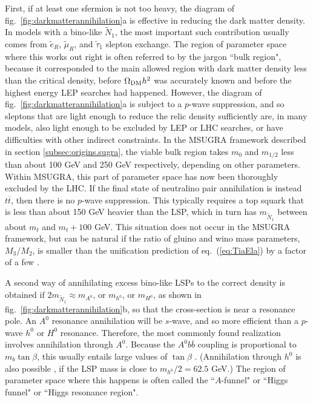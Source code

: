 \documentclass[12pt]{article}
\def\stilde{\widetilde}
\begin{document}
First, if at least one sfermion is not too heavy, the diagram of 
fig.~\ref{fig:darkmatterannihilation}a is effective in reducing the dark 
matter density. In models with a bino-like $\stilde N_1$, the most 
important such contribution usually comes from $\stilde e_R$, $\stilde 
\mu_R$, and $\stilde \tau_1$ slepton exchange. The region of parameter 
space where this works out right is often referred to by the jargon ``bulk 
region", because it corresponded to the main allowed region with dark 
matter density less than the critical density, before $\Omega_{\rm DM} 
h^2$ was accurately known and before the highest energy LEP searches had 
happened. However, the diagram of fig.~\ref{fig:darkmatterannihilation}a 
is subject to a $p$-wave suppression, and so sleptons that are light 
enough to reduce the relic density sufficiently are, in many models, also 
light enough to be excluded by LEP or LHC searches, 
or have difficulties with other indirect constraints. 
In the MSUGRA framework described in 
section \ref{subsec:origins.sugra}, the viable bulk region  
takes $m_0$ and $m_{1/2}$ less than about 100 GeV and 250 GeV 
respectively, depending on other parameters. Within MSUGRA, this part of
parameter space has now been thoroughly excluded by the LHC.
%
If the final state of neutralino pair annihilation 
is instead $t \overline t$, then there is no $p$-wave
suppression. This typically requires a top squark that is less than
about 150 GeV heavier than the LSP, which in turn has $m_{\tilde N_1}$ 
between about
$m_t$ and $m_t + 100$ GeV. This situation
does not occur in the MSUGRA framework,
but can be natural if the ratio of gluino and wino mass parameters, 
$M_3/M_2$, is 
smaller than the unification prediction of eq.~(\ref{eq:TiaEla}) by a 
factor of a few \cite{Compressed}. 

A second way of annihilating excess bino-like LSPs to the correct density 
is obtained if $2 m_{\tilde N_1} \approx m_{A^0}$, or $m_{h^0}$, or 
$m_{H^0}$, as shown in fig.~\ref{fig:darkmatterannihilation}b, so that the 
cross-section is near a resonance pole. An $A^0$ resonance annihilation 
will be $s$-wave, and so more efficient than a $p$-wave $h^0$ or $H^0$ 
resonance. Therefore, the most commonly found realization involves 
annihilation through $A^0$. Because the $A^0 b \overline b$ coupling is 
proportional to $m_b \tan\beta$, this usually entails large values of 
$\tan\beta$ \cite{DNDM}. (Annihilation through $h^0$ is also possible 
\cite{hfunnel}, if the LSP mass is close to $m_{h^0}/2 = 62.5$ GeV.) 
The region of parameter space where this happens is often 
called the ``$A$-funnel" or ``Higgs funnel" or ``Higgs resonance region".
\end{document}
